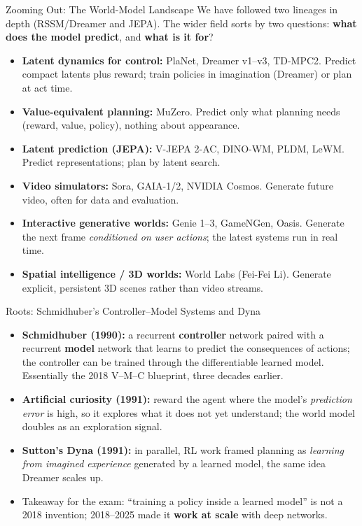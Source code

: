 \begin{frame}{Zooming Out: The World-Model Landscape}
  We have followed two lineages in depth (RSSM/Dreamer and JEPA). The wider field sorts by two questions: \textbf{what does the model predict}, and \textbf{what is it for}?
  \begin{itemize}\itemsep0.12em
    \item \textbf{Latent dynamics for control:} PlaNet, Dreamer v1--v3, TD-MPC2. Predict compact latents plus reward; train policies in imagination (Dreamer) or plan at act time.
    \item \textbf{Value-equivalent planning:} MuZero. Predict only what planning needs (reward, value, policy), nothing about appearance.
    \item \textbf{Latent prediction (JEPA):} V-JEPA 2-AC, DINO-WM, PLDM, LeWM. Predict representations; plan by latent search.
    \item \textbf{Video simulators:} Sora, GAIA-1/2, NVIDIA Cosmos. Generate future video, often for data and evaluation.
    \item \textbf{Interactive generative worlds:} Genie 1--3, GameNGen, Oasis. Generate the next frame \emph{conditioned on user actions}; the latest systems run in real time.
    \item \textbf{Spatial intelligence / 3D worlds:} World Labs (Fei-Fei Li). Generate explicit, persistent 3D scenes rather than video streams.
  \end{itemize}
\end{frame}

\begin{frame}{Roots: Schmidhuber's Controller--Model Systems and Dyna}
  \begin{itemize}\itemsep0.28em
    \item \textbf{Schmidhuber (1990):} a recurrent \textbf{controller} network paired with a recurrent \textbf{model} network that learns to predict the consequences of actions; the controller can be trained through the differentiable learned model. Essentially the 2018 V--M--C blueprint, three decades earlier.
    \item \textbf{Artificial curiosity (1991):} reward the agent where the model's \emph{prediction error} is high, so it explores what it does not yet understand; the world model doubles as an exploration signal.
    \item \textbf{Sutton's Dyna (1991):} in parallel, RL work framed planning as \emph{learning from imagined experience} generated by a learned model, the same idea Dreamer scales up.
    \item Takeaway for the exam: ``training a policy inside a learned model'' is not a 2018 invention; 2018--2025 made it \textbf{work at scale} with deep networks.
  \end{itemize}
\end{frame}

